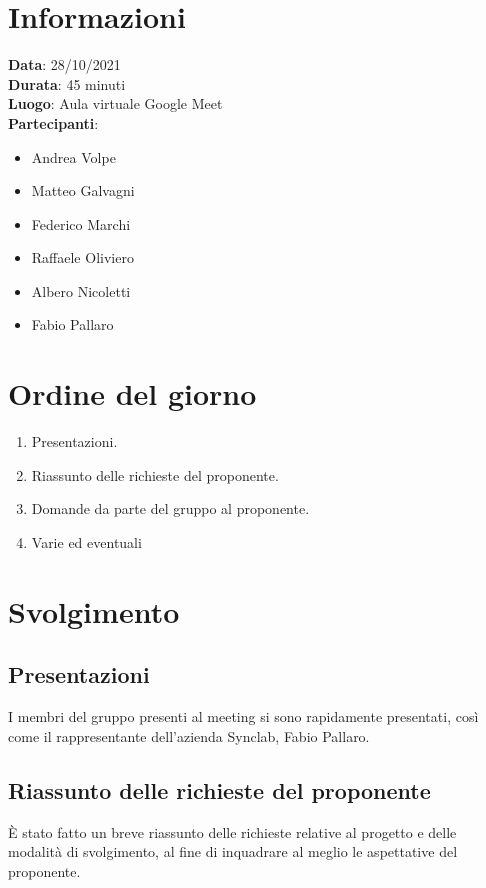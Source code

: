 \documentclass[a4paper, 12pt]{article}
\begin{document}
\makefrontpage

\section{Informazioni}
\textbf{Data}: 28/10/2021\\
\textbf{Durata}: 45 minuti\\
\textbf{Luogo}: Aula virtuale Google Meet\\
\textbf{Partecipanti}:
\begin{itemize}
	\item Andrea Volpe
	\item Matteo Galvagni
	\item Federico Marchi
	\item Raffaele Oliviero
	\item Albero Nicoletti
	\item Fabio Pallaro
\end{itemize}

\section{Ordine del giorno}
\begin{enumerate}
    \item Presentazioni.
    \item Riassunto delle richieste del proponente.
    \item Domande da parte del gruppo al proponente.
    \item Varie ed eventuali
\end{enumerate}

\section{Svolgimento}

\subsection{Presentazioni}
I membri del gruppo presenti al meeting si sono rapidamente presentati, così come il rappresentante dell'azienda Synclab, Fabio Pallaro.

\subsection{Riassunto delle richieste del proponente}
È stato fatto un breve riassunto delle richieste relative al progetto e delle modalità di svolgimento, al fine di inquadrare al meglio le aspettative del proponente.
\end{document}
